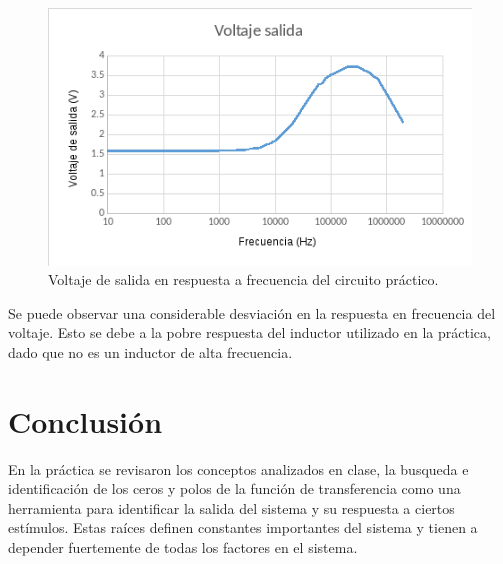 \documentclass[letterpaper,11pt]{article}
\begin{document}
		\begin{figure}[h!]
			\centering
			\includegraphics[width=0.7\linewidth]{med_ac_an}
			\caption{Voltaje de salida en respuesta a frecuencia del circuito práctico.}
			\label{fig:med_ac_an}
		\end{figure}
		Se puede observar una considerable desviación en la respuesta en frecuencia del voltaje. Esto se debe a la pobre respuesta del inductor utilizado en la práctica, dado que no es un inductor de alta frecuencia.
	\section{Conclusión}
		En la práctica se revisaron los conceptos analizados en clase, la busqueda e identificación de los ceros y polos de la función de transferencia como una herramienta para identificar la salida del sistema y su respuesta a ciertos estímulos. Estas raíces definen constantes importantes del sistema y tienen a depender fuertemente de todas los factores en el sistema. 
\end{document}
